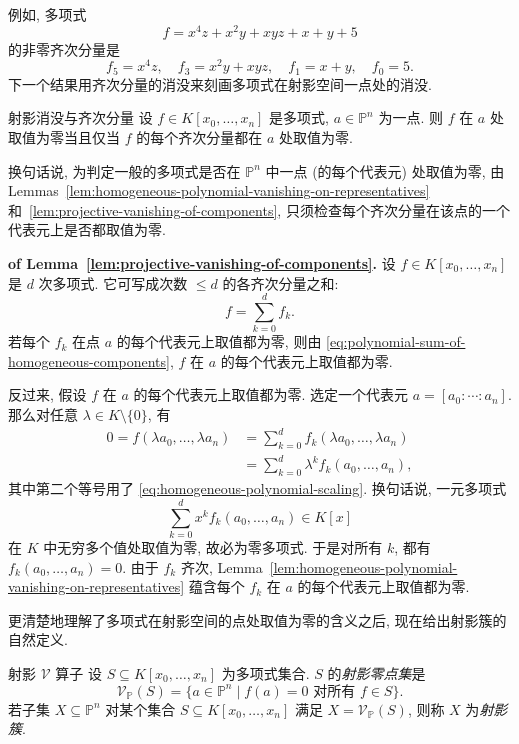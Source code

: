 例如, 多项式
\[
  f=x^{4}z+x^{2}y+xyz+x+y+5
\]
的非零齐次分量是
\[
  f_{5}=x^{4}z,\quad f_{3}=x^{2}y+xyz,\quad f_{1}=x+y,\quad f_{0}=5.
\]
下一个结果用齐次分量的消没来刻画多项式在射影空间一点处的消没.

\begin{Lemma}{射影消没与齐次分量}\leavevmode\label{lem:projective-vanishing-of-components}
设 $f\in K[x_{0},\ldots,x_{n}]$ 是多项式, $a\in\mathbb{P}^{n}$ 为一点. 则 $f$ 在 $a$ 处取值为零当且仅当 $f$ 的每个齐次分量都在 $a$ 处取值为零.
\end{Lemma}

换句话说, 为判定一般的多项式是否在 $\mathbb{P}^{n}$ 中一点 (的每个代表元) 处取值为零, 由 Lemmas~\ref{lem:homogeneous-polynomial-vanishing-on-representatives} 和~\ref{lem:projective-vanishing-of-components}, 只须检查每个齐次分量在该点的一个代表元上是否都取值为零.

\begin{Proof}\textbf{of Lemma~\ref{lem:projective-vanishing-of-components}.}\quad
设 $f\in K[x_{0},\ldots,x_{n}]$ 是 $d$ 次多项式. 它可写成次数 $\leq d$ 的各齐次分量之和:
\begin{equation}\label{eq:polynomial-sum-of-homogeneous-components}
  f=\sum_{k=0}^{d}f_{k}.
\end{equation}
若每个 $f_{k}$ 在点 $a$ 的每个代表元上取值都为零, 则由 \eqref{eq:polynomial-sum-of-homogeneous-components}, $f$ 在 $a$ 的每个代表元上取值都为零.

反过来, 假设 $f$ 在 $a$ 的每个代表元上取值都为零. 选定一个代表元 $a=[a_{0}:\cdots:a_{n}]$. 那么对任意 $\lambda\in K\setminus\{0\}$, 有
\[
  \begin{aligned}
    0=f(\lambda a_{0},\ldots,\lambda a_{n})
      &=\sum_{k=0}^{d}f_{k}(\lambda a_{0},\ldots,\lambda a_{n})\\
      &=\sum_{k=0}^{d}\lambda^{k}f_{k}(a_{0},\ldots,a_{n}),
  \end{aligned}
\]
其中第二个等号用了 \eqref{eq:homogeneous-polynomial-scaling}. 换句话说, 一元多项式
\[
  \sum_{k=0}^{d}x^{k}f_{k}(a_{0},\ldots,a_{n})\in K[x]
\]
在 $K$ 中无穷多个值处取值为零, 故必为零多项式. 于是对所有 $k$, 都有 $f_{k}(a_{0},\ldots,a_{n})=0$. 由于 $f_{k}$ 齐次, Lemma~\ref{lem:homogeneous-polynomial-vanishing-on-representatives} 蕴含每个 $f_{k}$ 在 $a$ 的每个代表元上取值都为零.
\end{Proof}

更清楚地理解了多项式在射影空间的点处取值为零的含义之后, 现在给出射影簇的自然定义.

\begin{Definition}{射影 $\mathcal{V}$ 算子}\leavevmode\label{def:projective-vanishing-operator}
设 $S\subseteq K[x_{0},\ldots,x_{n}]$ 为多项式集合. $S$ 的\emph{射影零点集}是
\[
  \mathcal{V}_{\mathbb{P}}(S)=\{a\in\mathbb{P}^{n}\mid f(a)=0\text{ 对所有 }f\in S\}.
\]
若子集 $X\subseteq\mathbb{P}^{n}$ 对某个集合 $S\subseteq K[x_{0},\ldots,x_{n}]$ 满足 $X=\mathcal{V}_{\mathbb{P}}(S)$, 则称 $X$ 为\emph{射影簇}.
\end{Definition}


